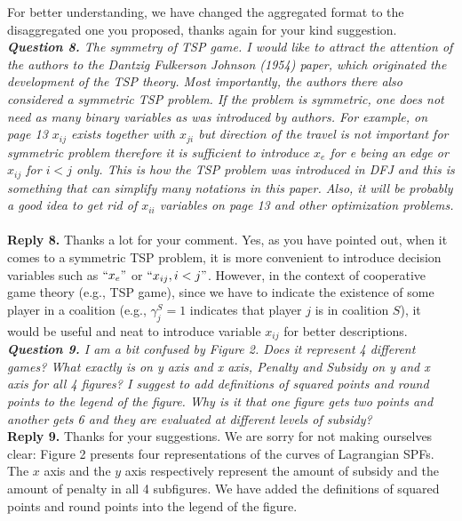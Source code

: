 \documentclass[11pt]{article}
\begin{document}
For better understanding, we have changed the aggregated format to the disaggregated one you proposed, thanks again for your kind suggestion.
\\[4mm]
\noindent \textit{\textbf{Question 8.}
The symmetry of TSP game. I would like to attract the attention of the authors to the Dantzig Fulkerson Johnson (1954) paper, which originated the development of the TSP theory. Most importantly, the authors there also considered a symmetric TSP problem. If the problem is symmetric, one does not need as many binary variables as was introduced by authors. For example, on page 13 $x_{ij}$ exists together with $x_{ji}$ but direction of the travel is not important for symmetric problem therefore it is sufficient to introduce $x_e$ for e being an edge or $x_{ij}$ for $i < j$ only. This is how the TSP problem was introduced in DFJ and this is something that can simplify many notations in this paper. Also, it will be probably a good idea to get rid of $x_{ii}$ variables on page 13 and other optimization problems.}
~\\[2mm]
\noindent \textbf{Reply 8.}
Thanks a lot for your comment.
Yes, as you have pointed out, when it comes to a symmetric TSP problem, it is more convenient to introduce decision variables such as $``x_e"$ or $``x_{ij}, i<j"$.
However, in the context of cooperative game theory (e.g., TSP game), since we have to indicate the existence of some player in a coalition (e.g., $\gamma^{S}_j=1$ indicates that player $j$ is in coalition $S$), it would be useful and neat to introduce variable $x_{ij}$ for better descriptions.
\\[4mm]
\noindent \textit{\textbf{Question 9.}
I am a bit confused by Figure 2. Does it represent 4 different games? What exactly is on y axis and x axis, Penalty and Subsidy on y and x axis for all 4 figures? I suggest to add definitions of squared points and round points to the legend of the figure. Why is it that one figure gets two points and another gets 6 and they are evaluated at different levels of subsidy?}
~\\[2mm]
\noindent \textbf{Reply 9.}
Thanks for your suggestions. 
We are sorry for not making ourselves clear:
Figure 2 presents four representations of the curves of Lagrangian SPFs. The $x$ axis and the $y$ axis respectively represent the amount of subsidy and the amount of penalty in all 4 subfigures. We have added the definitions of squared points and round points into the legend of the figure.
\end{document}
